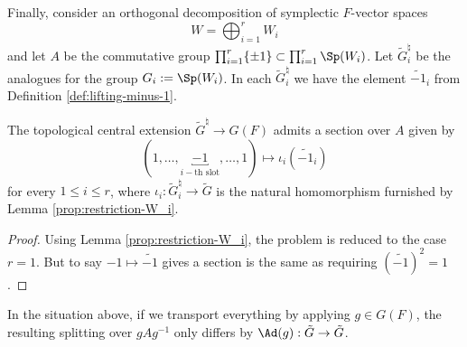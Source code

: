 \documentclass[a4paper,10pt]{article}
\begin{document}
Finally, consider an orthogonal decomposition of symplectic $F$-vector spaces
\[ W = \bigoplus_{i=1}^r W_i \]
and let $A$ be the commutative group $\prod_{i=1}^r \{\pm 1\} \subset \prod_{i=1}^r \Sp(W_i)$. Let $\tilde{G}^\natural_i$ be the analogues for the group $G_i := \Sp(W_i)$. In each $\tilde{G}^\natural_i$ we have the element $\widetilde{-1}_i$ from Definition \ref{def:lifting-minus-1}.

\begin{proposition}\label{prop:lifting-A}
	The topological central extension $\tilde{G}^\natural \to G(F)$ admits a section over $A$ given by
	\[ (1, \ldots, \underbracket{-1}_{i-\text{th slot}}, \ldots, 1) \longmapsto \iota_i\left( \widetilde{-1}_i \right) \]
	for every $1 \leq i \leq r$, where $\iota_i: \tilde{G}^\natural_i \to \tilde{G}$ is the natural homomorphism furnished by Lemma \ref{prop:restriction-W_i}.
\end{proposition}
\begin{proof}
	Using Lemma \ref{prop:restriction-W_i}, the problem is reduced to the case $r=1$. But to say $-1 \mapsto \widetilde{-1}$ gives a section is the same as requiring $(\widetilde{-1})^2 = 1$.
\end{proof}

\begin{remark}\label{rem:splitting-invariance}
	In the situation above, if we transport everything by applying $g \in G(F)$, the resulting splitting over $gAg^{-1}$ only differs by $\Ad(g): \tilde{G} \to \tilde{G}$.
\end{remark}
\end{document}

